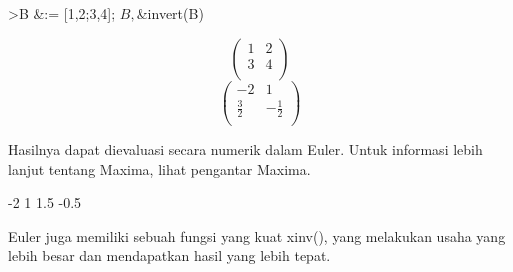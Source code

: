 \documentclass[a4paper,10pt]{article}
\begin{document}
\begin{eulernotebook}
\begin{eulerttcomment}
\end{eulerttcomment}
\begin{eulerprompt}
>B &:= [1,2;3,4]; $B, $&invert(B)
\end{eulerprompt}
\begin{eulerformula}
\[
\begin{pmatrix}1 & 2 \\ 3 & 4 \\   \end{pmatrix}
\]
\[
\begin{pmatrix}-2 & 1 \\ \frac{3}{2} & -\frac{1}{2} \\   \end{pmatrix}
\]
\end{eulerformula}
\begin{eulercomment}
Hasilnya dapat dievaluasi secara numerik dalam Euler. Untuk informasi
lebih lanjut tentang Maxima, lihat pengantar Maxima.
\end{eulercomment}
\begin{euleroutput}
             -2             1 
            1.5          -0.5 
\end{euleroutput}
\begin{eulercomment}
Euler juga memiliki sebuah fungsi yang kuat xinv(), yang melakukan
usaha yang lebih besar dan mendapatkan hasil yang lebih tepat.


\end{eulercomment}
\end{eulernotebook}
\end{document}
